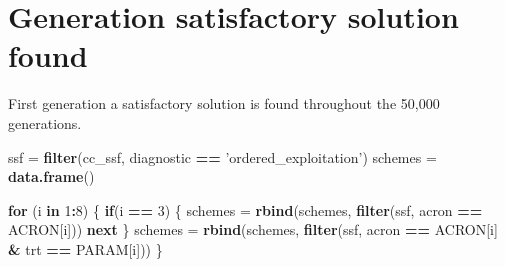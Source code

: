 \documentclass[]{book}
\newenvironment{Shaded}{\begin{snugshade}}{\end{snugshade}}
\newcommand{\ControlFlowTok}[1]{\textcolor[rgb]{0.13,0.29,0.53}{\textbf{#1}}}
\newcommand{\DecValTok}[1]{\textcolor[rgb]{0.00,0.00,0.81}{#1}}
\newcommand{\KeywordTok}[1]{\textcolor[rgb]{0.13,0.29,0.53}{\textbf{#1}}}
\newcommand{\NormalTok}[1]{#1}
\newcommand{\OperatorTok}[1]{\textcolor[rgb]{0.81,0.36,0.00}{\textbf{#1}}}
\newcommand{\StringTok}[1]{\textcolor[rgb]{0.31,0.60,0.02}{#1}}
\begin{document}
\hypertarget{generation-satisfactory-solution-found-1}{%
\section{Generation satisfactory solution found}\label{generation-satisfactory-solution-found-1}}

First generation a satisfactory solution is found throughout the 50,000 generations.

\begin{Shaded}
\begin{Highlighting}[]
\NormalTok{ssf =}\StringTok{ }\KeywordTok{filter}\NormalTok{(cc_ssf, diagnostic }\OperatorTok{==}\StringTok{ 'ordered_exploitation'}\NormalTok{)}
\NormalTok{schemes =}\StringTok{ }\KeywordTok{data.frame}\NormalTok{()}

\ControlFlowTok{for}\NormalTok{ (i }\ControlFlowTok{in} \DecValTok{1}\OperatorTok{:}\DecValTok{8}\NormalTok{) \{}
  \ControlFlowTok{if}\NormalTok{(i }\OperatorTok{==}\StringTok{ }\DecValTok{3}\NormalTok{)}
\NormalTok{  \{}
\NormalTok{    schemes =}\StringTok{ }\KeywordTok{rbind}\NormalTok{(schemes, }\KeywordTok{filter}\NormalTok{(ssf, acron }\OperatorTok{==}\StringTok{ }\NormalTok{ACRON[i]))}
    \ControlFlowTok{next}
\NormalTok{  \}}
\NormalTok{  schemes =}\StringTok{ }\KeywordTok{rbind}\NormalTok{(schemes, }\KeywordTok{filter}\NormalTok{(ssf, acron }\OperatorTok{==}\StringTok{ }\NormalTok{ACRON[i] }\OperatorTok{&}\StringTok{ }\NormalTok{trt }\OperatorTok{==}\StringTok{ }\NormalTok{PARAM[i]))}
\NormalTok{\}}


\end{Highlighting}
\end{Shaded}
\end{document}

